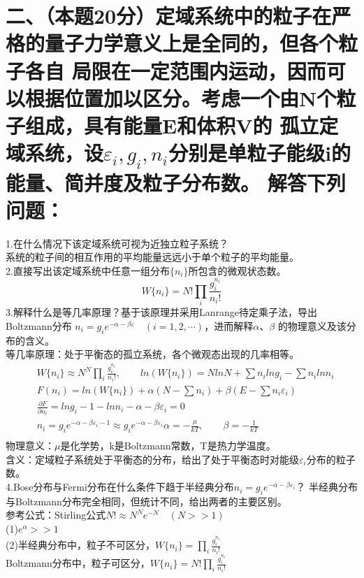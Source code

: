 \documentclass[UTF8]{ctexart}
\begin{document}
\section*{二、（本题20分）定域系统中的粒子在严格的量子力学意义上是全同的，但各个粒子各自
  局限在一定范围内运动，因而可以根据位置加以区分。考虑一个由N个粒子组成，具有能量E和体积V的
  孤立定域系统，设$\varepsilon_i,g_i,n_i$分别是单粒子能级i的能量、简并度及粒子分布数。
  解答下列问题：}
1.在什么情况下该定域系统可视为近独立粒子系统？\\
系统的粒子间的相互作用的平均能量远远小于单个粒子的平均能量。\\
2.直接写出该定域系统中任意一组分布$\{n_i\}$所包含的微观状态数。\\
\begin{equation*}
  W\{n_i\}=N!\prod\limits_i\frac{g_i^{n_i}}{n_i!}
\end{equation*}
3.解释什么是等几率原理？基于该原理并采用Lanrange待定乘子法，导出Boltzmann分布
$n_i=g_ie^{-\alpha-\beta\varepsilon}\quad(i=1,2,\cdots)$，进而解释$\alpha$、$\beta$
的物理意义及该分布的含义。\\
等几率原理：处于平衡态的孤立系统，各个微观态出现的几率相等。
\begin{equation*}
  \begin{aligned}
     & W\{n_i\}\approx N^N\prod\limits_i\frac{g_i^{n_i}}{n_i!},\quad\quad
    ln(W\{n_i\})=NlnN+\sum n_ilng_i-\sum n_ilnn_i                                       \\
     & F(n_i)=ln(W\{n_i\})+\alpha(N-\sum n_i)+\beta(E-\sum n_i\varepsilon_i)            \\
     & \frac{\partial F}{\partial n_i}=lng_i-1-lnn_i-\alpha-\beta\varepsilon_i=0        \\
     & n_i=g_ie^{-\alpha-\beta\varepsilon_i-1}\approx g_ie^{-\alpha-\beta\varepsilon_i}
    \alpha=-\frac{\mu}{kT},\quad\quad \beta=-\frac{1}{kT}                               \\
  \end{aligned}
\end{equation*}
物理意义：$\mu$是化学势，k是Boltzmann常数，T是热力学温度。\\
含义：定域粒子系统处于平衡态的分布，给出了处于平衡态时对能级$\varepsilon_i$分布的粒子数。\\
4.Bose分布与Fermi分布在什么条件下趋于半经典分布$n_i=g_ie^{-\alpha-\beta\varepsilon_i}$？
半经典分布与Boltzmann分布完全相同，但统计不同，给出两者的主要区别。\\
参考公式：Stirling公式$N!\approx N^Ne^{-N}\quad(N>>1)$\\
(1)$e^\alpha>>1$\\
(2)半经典分布中，粒子不可区分，$W\{n_i\}=\prod\limits_i\frac{g_i^{n_i}}{n_i!}$\\
Boltzmann分布中，粒子可区分，$W\{n_i\}=N!\prod\limits_i\frac{g_i^{n_i}}{n_i!}$\\
\end{document}
